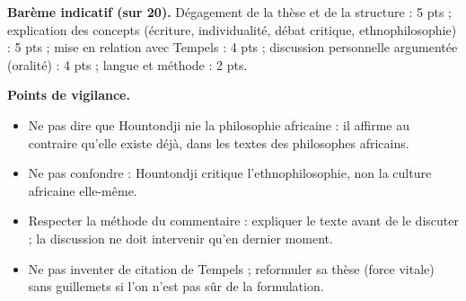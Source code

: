 \documentclass[11pt]{article}
\begin{document}
\begin{corrige}
\textbf{Barème indicatif (sur 20).} Dégagement de la thèse et de la structure : 5 pts ; explication des concepts (écriture, individualité, débat critique, ethnophilosophie) : 5 pts ; mise en relation avec Tempels : 4 pts ; discussion personnelle argumentée (oralité) : 4 pts ; langue et méthode : 2 pts.

\textbf{Points de vigilance.}
\begin{itemize}
\item Ne pas dire que Hountondji \guillemotleft nie la philosophie africaine \guillemotright : il affirme au contraire qu'elle existe déjà, dans les textes des philosophes africains.
\item Ne pas confondre : Hountondji critique l'ethnophilosophie, non la culture africaine elle-même.
\item Respecter la méthode du commentaire : expliquer le texte avant de le discuter ; la discussion ne doit intervenir qu'en dernier moment.
\item Ne pas inventer de citation de Tempels ; reformuler sa thèse (force vitale) sans guillemets si l'on n'est pas sûr de la formulation.
\end{itemize}

\end{corrige}
\end{document}
